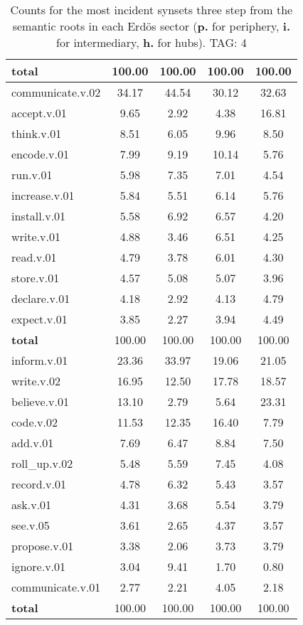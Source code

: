 \begin{table}[h!]
\begin{center}
\begin{tabular}{| l || c | c | c | c |}
{{\bf total}} & 100.00  & 100.00  & 100.00  & 100.00 \\\hline\hline\hline
communicate.v.02 & 34.17  & 44.54  & 30.12  & 32.63 \\\hline
accept.v.01 & 9.65  & 2.92  & 4.38  & 16.81 \\\hline
think.v.01 & 8.51  & 6.05  & 9.96  & 8.50 \\\hline
encode.v.01 & 7.99  & 9.19  & 10.14  & 5.76 \\\hline
run.v.01 & 5.98  & 7.35  & 7.01  & 4.54 \\\hline
increase.v.01 & 5.84  & 5.51  & 6.14  & 5.76 \\\hline
install.v.01 & 5.58  & 6.92  & 6.57  & 4.20 \\\hline
write.v.01 & 4.88  & 3.46  & 6.51  & 4.25 \\\hline
read.v.01 & 4.79  & 3.78  & 6.01  & 4.30 \\\hline
store.v.01 & 4.57  & 5.08  & 5.07  & 3.96 \\\hline
declare.v.01 & 4.18  & 2.92  & 4.13  & 4.79 \\\hline
expect.v.01 & 3.85  & 2.27  & 3.94  & 4.49 \\\hline\hline
{{\bf total}} & 100.00  & 100.00  & 100.00  & 100.00 \\\hline\hline\hline
inform.v.01 & 23.36  & 33.97  & 19.06  & 21.05 \\\hline
write.v.02 & 16.95  & 12.50  & 17.78  & 18.57 \\\hline
believe.v.01 & 13.10  & 2.79  & 5.64  & 23.31 \\\hline
code.v.02 & 11.53  & 12.35  & 16.40  & 7.79 \\\hline
add.v.01 & 7.69  & 6.47  & 8.84  & 7.50 \\\hline
roll\_up.v.02 & 5.48  & 5.59  & 7.45  & 4.08 \\\hline
record.v.01 & 4.78  & 6.32  & 5.43  & 3.57 \\\hline
ask.v.01 & 4.31  & 3.68  & 5.54  & 3.79 \\\hline
see.v.05 & 3.61  & 2.65  & 4.37  & 3.57 \\\hline
propose.v.01 & 3.38  & 2.06  & 3.73  & 3.79 \\\hline
ignore.v.01 & 3.04  & 9.41  & 1.70  & 0.80 \\\hline
communicate.v.01 & 2.77  & 2.21  & 4.05  & 2.18 \\\hline\hline
{{\bf total}} & 100.00  & 100.00  & 100.00  & 100.00 \\\hline
\end{tabular}
\caption{Counts for the most incident synsets three step from the semantic roots in each Erd\"os sector ({\bf p.} for periphery, {\bf i.} for intermediary, {\bf h.} for hubs). TAG: 4}
\end{center}
\end{table}